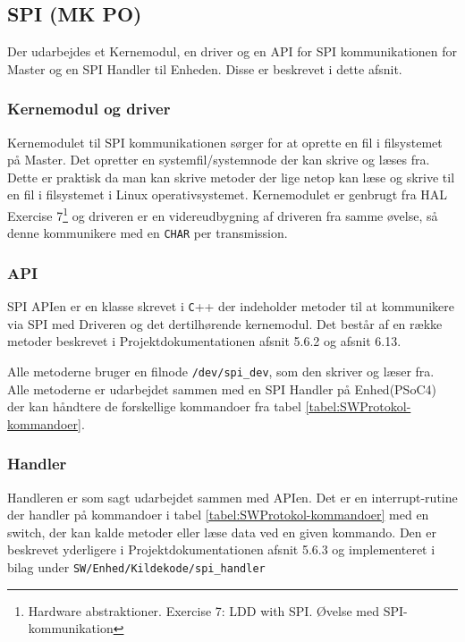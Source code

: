 \subsection{SPI (MK PO)}

Der udarbejdes et Kernemodul, en driver og en API for SPI kommunikationen for Master og en SPI Handler til Enheden. Disse er beskrevet i dette afsnit.

\subsubsection*{Kernemodul og driver}

Kernemodulet til SPI kommunikationen sørger for at oprette en fil i filsystemet på Master. Det opretter en systemfil/systemnode der kan skrive og læses fra. Dette er praktisk da man kan skrive metoder der lige netop kan læse og skrive til en fil i filsystemet i Linux operativsystemet. Kernemodulet er genbrugt fra HAL Exercise 7\footnote{Hardware abstraktioner. Exercise 7: LDD with SPI. Øvelse med SPI-kommunikation} og driveren er en videreudbygning af driveren fra samme øvelse, så denne kommunikere med en \verb+CHAR+ per transmission.

\subsubsection*{API}

SPI APIen er en klasse skrevet i \verb+C+++ der indeholder metoder til at kommunikere via SPI med Driveren og det dertilhørende kernemodul. Det består af en række metoder beskrevet i Projektdokumentationen afsnit 5.6.2 og afsnit 6.13. 

Alle metoderne bruger en filnode \verb+/dev/spi_dev+, som den skriver og læser fra. Alle metoderne er udarbejdet sammen med en SPI Handler på Enhed(PSoC4) der kan håndtere de forskellige kommandoer fra tabel \ref{tabel:SWProtokol-kommandoer}.

\subsubsection*{Handler}

Handleren er som sagt udarbejdet sammen med APIen. Det er en interrupt-rutine der handler på kommandoer i tabel \ref{tabel:SWProtokol-kommandoer} med en switch, der kan kalde metoder eller læse data ved en given kommando. Den er beskrevet yderligere i Projektdokumentationen afsnit 5.6.3 og implementeret i bilag under \verb+SW/Enhed/Kildekode/spi_handler+